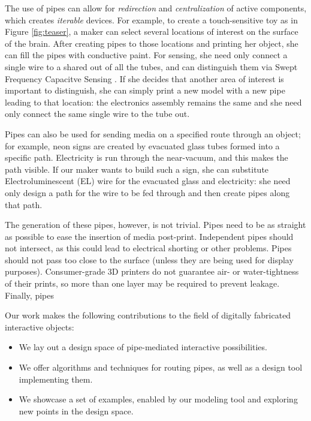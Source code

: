 The use of pipes can allow for \emph{redirection} and \emph{centralization} of active components, which creates \emph{iterable} devices.  For example, to create a touch-sensitive toy as in Figure \ref{fig:teaser}, a maker can select several locations of interest on the surface of the brain.  After creating pipes to those locations and printing her object, she can fill the pipes with conductive paint.  For sensing, she need only connect a single wire to a shared out of all the tubes, and can distinguish them via Swept Frequency Capacitve Sensing \cite{Sato-touche}.  If she decides that another area of interest is important to distinguish, she can simply print a new model with a new pipe leading to that location: the electronics assembly remains the same and she need only connect the same single wire to the tube out.  

Pipes can also be used for sending media on a specified route through an object; for example, neon signs are created by evacuated glass tubes formed into a specific path.  Electricity is run through the near-vacuum, and this makes the path visible.  If our maker wants to build such a sign, she can substitute Electroluminescent (EL) wire for the evacuated glass and electricity: she need only design a path for the wire to be fed through and then create pipes along that path.

The generation of these pipes, however, is not trivial.  Pipes need to be as straight as possible to ease the insertion of media post-print.  Independent pipes should not intersect, as this could lead to electrical shorting or other problems.  Pipes should not pass too close to the surface (unless they are being used for display purposes).  Consumer-grade 3D printers do not guarantee air- or water-tightness of their prints, so more than one layer may be required to prevent leakage.  Finally, pipes 

Our work makes the following contributions to the field of digitally fabricated interactive objects:

\begin{itemize}
\item We lay out a design space of pipe-mediated interactive possibilities. 
\item We offer algorithms and techniques for routing pipes, as well as a design tool implementing them.
\item We showcase a set of examples, enabled by our modeling tool and exploring new points in the design space.
\end{itemize}

